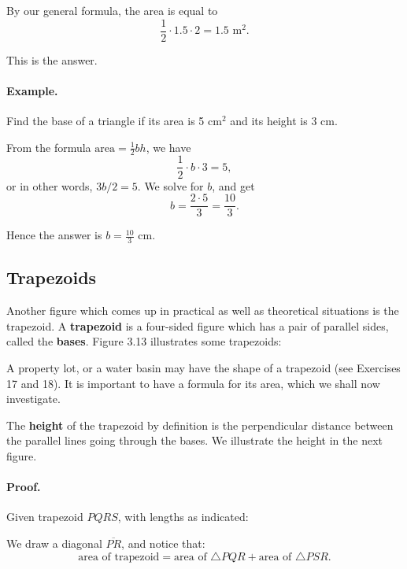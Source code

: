 \documentclass[12pt]{book} %
\begin{document}

By our general formula, the area is equal to
\[
\frac12\cdot 1.5\cdot 2 = 1.5 \text{ m}^2.
\]

This is the answer.

\paragraph{Example.}
Find the base of a triangle if its area is 5 cm$^2$ and its height is 3 cm.

From the formula $\text{area}=\frac12 bh$, we have
\[
\frac12\cdot b\cdot 3 = 5,
\]
or in other words, $3b/2=5$. We solve for $b$, and get
\[
b=\frac{2\cdot 5}{3}=\frac{10}{3}.
\]

Hence the answer is $b=\frac{10}{3}$ cm.

\subsection*{Trapezoids}

Another figure which comes up in practical as well as theoretical situations is the trapezoid. A \textbf{trapezoid} is a four-sided figure which has a pair of parallel sides, called the \textbf{bases}. Figure 3.13 illustrates some trapezoids:


A property lot, or a water basin may have the shape of a trapezoid (see Exercises 17 and 18). It is important to have a formula for its area, which we shall now investigate.

The \textbf{height} of the trapezoid by definition is the perpendicular distance between the parallel lines going through the bases. We illustrate the height in the next figure.



\paragraph{Proof.}
Given trapezoid $PQRS$, with lengths as indicated:


We draw a diagonal $\overline{PR}$, and notice that:
\[
\text{area of trapezoid} = \text{area of }\triangle PQR + \text{area of }\triangle PSR.
\]
\end{document}
